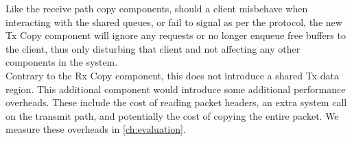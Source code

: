 Like the receive path copy components, should a client misbehave when interacting with the shared queues, or fail to signal as per
the protocol, the new Tx Copy component will ignore any requests or no longer enqueue free buffers to the client, thus only disturbing
that client and not affecting any other components in the system.\\
Contrary to the Rx Copy component, this does not introduce a shared Tx data region. 
This additional component would introduce some additional performance overheads. These include the cost of reading packet headers, 
an extra system call on the transmit path, and potentially the cost of copying the entire packet. 
We measure these overheads in \autoref{ch:evaluation}.\\
